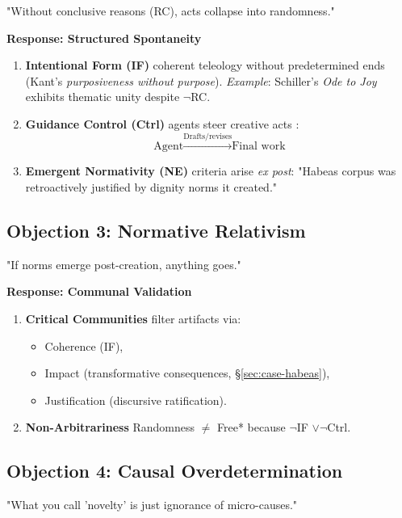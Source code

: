 \documentclass[11pt,a4paper]{article}
\begin{document}
"Without conclusive reasons (RC), acts collapse into randomness." \cite[ p. 16]{frankfurt1971}

\textbf{Response: Structured Spontaneity}

\begin{enumerate}
  \item \textbf{Intentional Form (IF)} coherent teleology without predetermined ends (Kant's \emph{purposiveness without purpose}). \emph{Example}: Schiller's \emph{Ode to Joy} exhibits thematic unity despite \(\neg\)RC.
  \item \textbf{Guidance Control (Ctrl)} agents steer creative acts \cite{fischer1998}: \[\text{Agent} \xrightarrow{\text{Drafts/revises}} \text{Final work}\]
  \item \textbf{Emergent Normativity (NE)} criteria arise \emph{ex post}: "Habeas corpus was retroactively justified by dignity norms it created." \cite[ p. 144]{epstein2021}
\end{enumerate}

\subsection{Objection 3: Normative Relativism}\label{sec:boundary-relativism}

"If norms emerge post-creation, anything goes." \cite[ p. 124]{strawson2023}

\textbf{Response: Communal Validation}

\begin{enumerate}
  \item \textbf{Critical Communities} filter artifacts via:
  \begin{itemize}
    \item Coherence (IF),
    \item Impact (transformative consequences, \S\ref{sec:case-habeas}),
    \item Justification (discursive ratification).
  \end{itemize}
  \item \textbf{Non-Arbitrariness} Randomness \(\neq\) Free* because \(\neg\)IF \(\vee\neg\)Ctrl.
\end{enumerate}

\subsection{Objection 4: Causal Overdetermination}\label{sec:boundary-overdetermination}

"What you call 'novelty' is just ignorance of micro-causes." \cite[ p. 75]{dennett2022}
\end{document}
